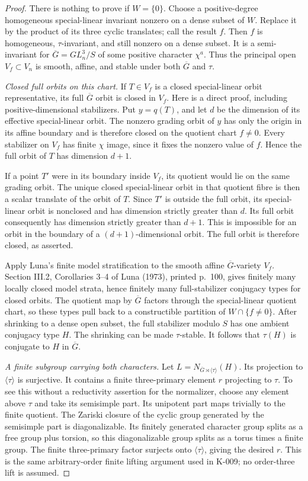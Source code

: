\begin{proof}
There is nothing to prove if $W=\{0\}$.  Choose a positive-degree
homogeneous special-linear invariant nonzero on a dense subset of
$W$.  Replace it by the product of its three cyclic translates;
call the result $f$.  Then $f$ is homogeneous, $\tau$-invariant,
and still nonzero on a dense subset.  It is a semi-invariant for
$\overline G=GL_n^3/S$ of some positive character $\chi^a$.
Thus the principal open $V_f\subset V_n$ is smooth, affine, and
stable under both $\overline G$ and $\tau$.

\emph{Closed full orbits on this chart.}
If $T\in V_f$ is a closed special-linear orbit representative,
its full $\overline G$ orbit is closed in $V_f$.  Here is a
direct proof, including positive-dimensional stabilizers.  Put
$y=q(T)$, and let $d$ be the dimension of its effective
special-linear orbit.  The nonzero grading orbit of $y$ has
only the origin in its affine boundary and is therefore closed
on the quotient chart $f\ne0$.  Every stabilizer on $V_f$ has
finite $\chi$ image, since it fixes the nonzero value of $f$.
Hence the full orbit of $T$ has dimension $d+1$.

If a point $T'$ were in its boundary inside $V_f$, its quotient
would lie on the same grading orbit.  The unique closed
special-linear orbit in that quotient fibre is then a scalar
translate of the orbit of $T$.  Since $T'$ is outside the full
orbit, its special-linear orbit is nonclosed and has dimension
strictly greater than $d$.  Its full orbit consequently has
dimension strictly greater than $d+1$.  This is impossible for
an orbit in the boundary of a $(d+1)$-dimensional orbit.
The full orbit is therefore closed, as asserted.

Apply Luna's finite model stratification to the smooth affine
$\overline G$-variety $V_f$.  Section III.2, Corollaries 3--4
of Luna (1973), printed p.~100, gives finitely many locally
closed model strata, hence finitely many full-stabilizer
conjugacy types for closed orbits.  The quotient map by
$\overline G$ factors through the special-linear quotient
chart, so these types pull back to a constructible partition
of $W\cap\{f\ne0\}$.  After shrinking to a dense open subset,
the full stabilizer modulo $S$ has one ambient conjugacy type
$H$.  The shrinking can be made $\tau$-stable.  It follows that
$\tau(H)$ is conjugate to $H$ in $\overline G$.

\emph{A finite subgroup carrying both characters.}
Let $L=N_{\overline G\rtimes\langle\tau\rangle}(H)$.
Its projection to $\langle\tau\rangle$ is surjective.  It
contains a finite three-primary element $r$ projecting to
$\tau$.  To see this without a reductivity assertion for the
normalizer, choose any element above $\tau$ and take its
semisimple part.  Its unipotent part maps trivially to the
finite quotient.  The Zariski closure of the cyclic group
generated by the semisimple part is diagonalizable.  Its
finitely generated character group splits as a free group
plus torsion, so this diagonalizable group splits as a torus
times a finite group.  The finite three-primary factor
surjects onto $\langle\tau\rangle$, giving the desired $r$.
This is the same arbitrary-order finite lifting argument used
in K-009; no order-three lift is assumed.


\end{proof}

